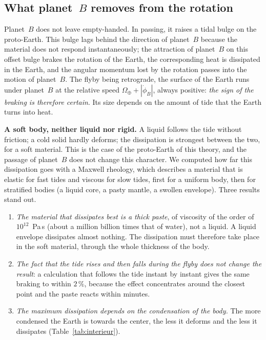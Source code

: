 \documentclass[11pt,a4paper]{article}
\begin{document}
\subsection{What planet~$B$ removes from the rotation}
\label{sec:despin}

Planet~$B$ does not leave empty-handed. In passing, it raises a tidal bulge on the proto-Earth. This bulge lags behind the direction of planet~$B$ because the material does not respond instantaneously; the attraction of planet~$B$ on this offset bulge brakes the rotation of the Earth, the corresponding heat is dissipated in the Earth, and the angular momentum lost by the rotation passes into the motion of planet~$B$. The flyby being retrograde, the surface of the Earth runs under planet~$B$ at the relative speed $\Omega_\oplus+|\dot\phi_B|$, always positive: \emph{the sign of the braking is therefore certain}. Its size depends on the amount of tide that the Earth turns into heat.

\textbf{A soft body, neither liquid nor rigid.} A liquid follows the tide without friction; a cold solid hardly deforms; the dissipation is strongest between the two, for a soft material. This is the case of the proto-Earth of this theory, and the passage of planet~$B$ does not change this character. We computed how far this dissipation goes with a Maxwell rheology, which describes a material that is elastic for fast tides and viscous for slow tides, first for a uniform body, then for stratified bodies (a liquid core, a pasty mantle, a swollen envelope). Three results stand out.

\begin{enumerate}[leftmargin=1.6em,itemsep=2pt]
\item \emph{The material that dissipates best is a thick paste}, of viscosity of the order of $10^{12}$~Pa\,s (about a million billion times that of water), not a liquid. A liquid envelope dissipates almost nothing. The dissipation must therefore take place in the soft material, through the whole thickness of the body.
\item \emph{The fact that the tide rises and then falls during the flyby does not change the result}: a calculation that follows the tide instant by instant gives the same braking to within $2\,\%$, because the effect concentrates around the closest point and the paste reacts within minutes.
\item \emph{The maximum dissipation depends on the condensation of the body.} The more condensed the Earth is towards the center, the less it deforms and the less it dissipates (Table~\ref{tab:interieur}).
\end{enumerate}
\end{document}
